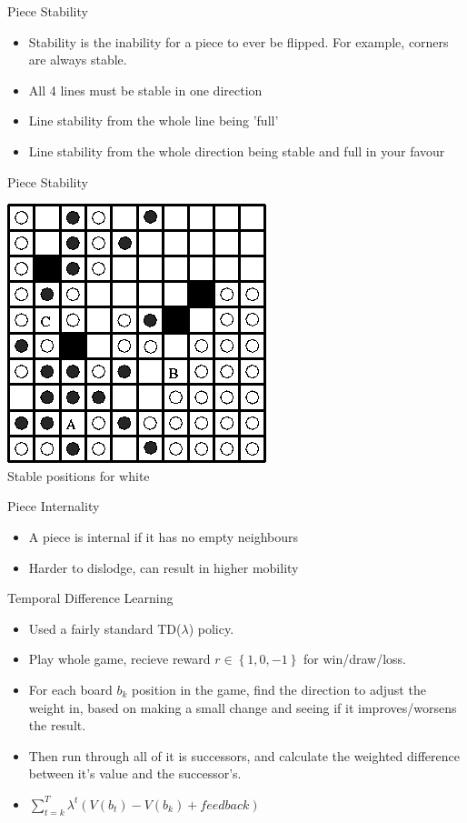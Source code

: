 \documentclass{beamer}
\begin{document}
\begin{frame}{Piece Stability}
    \begin{itemize}
  \item
  Stability is the inability for a piece to ever be flipped. For example, corners are always stable.
  \item
   All 4 lines must be stable in one direction
  \item
   Line stability from the whole line being 'full'
  \item
   Line stability from the whole direction being stable and full in your favour
  \end{itemize}

\end{frame}

\begin{frame}{Piece Stability}
\begin{center}
\includegraphics[scale=0.50]{stability.PNG}\\
Stable positions for white
\end{center}
\end{frame}

\begin{frame}{Piece Internality}
    \begin{itemize}
  \item
  A piece is internal if it has no empty neighbours
  \item
   Harder to dislodge, can result in higher mobility
  \end{itemize}
\end{frame}

\begin{frame}{Temporal Difference Learning}
   \begin{itemize}
  \item
  	Used a fairly standard TD($\lambda$) policy.
  \item
	Play whole game, recieve reward $r\in \left\{1,0,-1 \right\}$ for win/draw/loss.
  \item
	For each board $b_k$ position in the game, find the direction to adjust the weight in, based on making a small change and seeing if it improves/worsens the result.
 \item
	Then run through all of it is successors, and calculate the weighted difference between it's value and the successor's.
  \item
	$\sum_{t=k}^T \lambda^t \left ( V(b_t) - V(b_k) + feedback \right)$
  \end{itemize}
\end{frame}
\end{document}
